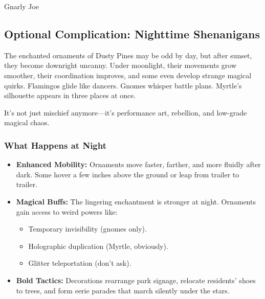 \begin{multicols}{2}
\begin{NPC}[description={Scrappy, Tactical, Bent on Revenge}]{Gnarly Joe}
    \DamageBox[%
        totalfatigue=2,%
        totalmild=1,totalmoderate=0,totalsevere=0,%
    ]
\end{NPC}



\subsection{Optional Complication: Nighttime Shenanigans}

The enchanted ornaments of Dusty Pines may be odd by day, but after sunset, they become downright uncanny. Under moonlight, their movements grow smoother, their coordination improves, and some even develop strange magical quirks. Flamingos glide like dancers. Gnomes whisper battle plans. Myrtle’s silhouette appears in three places at once.

It’s not just mischief anymore—it’s performance art, rebellion, and low-grade magical chaos.

\subsubsection{What Happens at Night}
\begin{itemize}
    \item \textbf{Enhanced Mobility:} Ornaments move faster, farther, and more fluidly after dark. Some hover a few inches above the ground or leap from trailer to trailer.
    \item \textbf{Magical Buffs:} The lingering enchantment is stronger at night. Ornaments gain access to weird powers like:
    \begin{itemize}
        \item Temporary invisibility (gnomes only).
        \item Holographic duplication (Myrtle, obviously).
        \item Glitter teleportation (don’t ask).
    \end{itemize}
    \item \textbf{Bold Tactics:} Decorations rearrange park signage, relocate residents’ shoes to trees, and form eerie parades that march silently under the stars.
\end{itemize}


\end{multicols}
